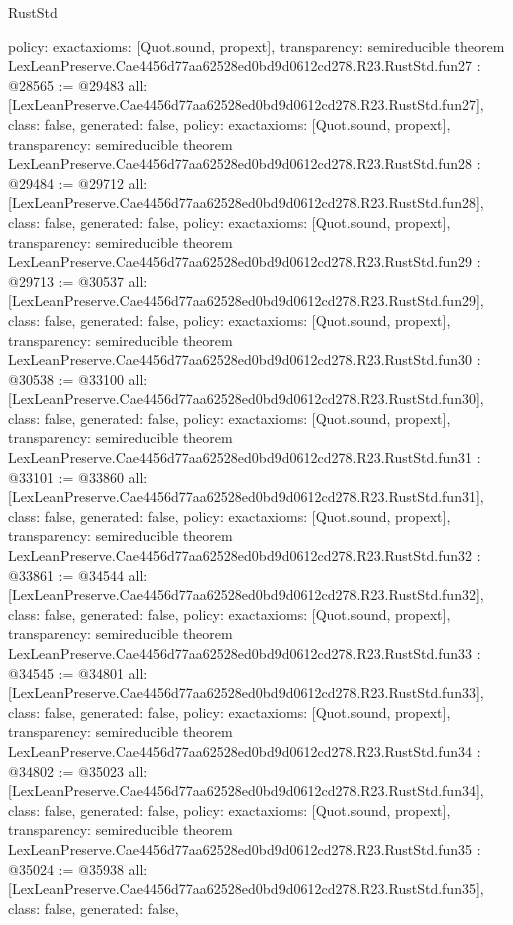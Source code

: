 \begin{lexlean}{RustStd}
\begin{coremodule}
{  policy: exact{axioms: [Quot.sound, propext]},
  transparency: semireducible
}
theorem LexLeanPreserve.Cae4456d77aa62528ed0bd9d0612cd278.R23.RustStd.fun27 : @28565 := @29483 {
  all: [LexLeanPreserve.Cae4456d77aa62528ed0bd9d0612cd278.R23.RustStd.fun27],
  class: false,
  generated: false,
  policy: exact{axioms: [Quot.sound, propext]},
  transparency: semireducible
}
theorem LexLeanPreserve.Cae4456d77aa62528ed0bd9d0612cd278.R23.RustStd.fun28 : @29484 := @29712 {
  all: [LexLeanPreserve.Cae4456d77aa62528ed0bd9d0612cd278.R23.RustStd.fun28],
  class: false,
  generated: false,
  policy: exact{axioms: [Quot.sound, propext]},
  transparency: semireducible
}
theorem LexLeanPreserve.Cae4456d77aa62528ed0bd9d0612cd278.R23.RustStd.fun29 : @29713 := @30537 {
  all: [LexLeanPreserve.Cae4456d77aa62528ed0bd9d0612cd278.R23.RustStd.fun29],
  class: false,
  generated: false,
  policy: exact{axioms: [Quot.sound, propext]},
  transparency: semireducible
}
theorem LexLeanPreserve.Cae4456d77aa62528ed0bd9d0612cd278.R23.RustStd.fun30 : @30538 := @33100 {
  all: [LexLeanPreserve.Cae4456d77aa62528ed0bd9d0612cd278.R23.RustStd.fun30],
  class: false,
  generated: false,
  policy: exact{axioms: [Quot.sound, propext]},
  transparency: semireducible
}
theorem LexLeanPreserve.Cae4456d77aa62528ed0bd9d0612cd278.R23.RustStd.fun31 : @33101 := @33860 {
  all: [LexLeanPreserve.Cae4456d77aa62528ed0bd9d0612cd278.R23.RustStd.fun31],
  class: false,
  generated: false,
  policy: exact{axioms: [Quot.sound, propext]},
  transparency: semireducible
}
theorem LexLeanPreserve.Cae4456d77aa62528ed0bd9d0612cd278.R23.RustStd.fun32 : @33861 := @34544 {
  all: [LexLeanPreserve.Cae4456d77aa62528ed0bd9d0612cd278.R23.RustStd.fun32],
  class: false,
  generated: false,
  policy: exact{axioms: [Quot.sound, propext]},
  transparency: semireducible
}
theorem LexLeanPreserve.Cae4456d77aa62528ed0bd9d0612cd278.R23.RustStd.fun33 : @34545 := @34801 {
  all: [LexLeanPreserve.Cae4456d77aa62528ed0bd9d0612cd278.R23.RustStd.fun33],
  class: false,
  generated: false,
  policy: exact{axioms: [Quot.sound, propext]},
  transparency: semireducible
}
theorem LexLeanPreserve.Cae4456d77aa62528ed0bd9d0612cd278.R23.RustStd.fun34 : @34802 := @35023 {
  all: [LexLeanPreserve.Cae4456d77aa62528ed0bd9d0612cd278.R23.RustStd.fun34],
  class: false,
  generated: false,
  policy: exact{axioms: [Quot.sound, propext]},
  transparency: semireducible
}
theorem LexLeanPreserve.Cae4456d77aa62528ed0bd9d0612cd278.R23.RustStd.fun35 : @35024 := @35938 {
  all: [LexLeanPreserve.Cae4456d77aa62528ed0bd9d0612cd278.R23.RustStd.fun35],
  class: false,
  generated: false,
}
\end{coremodule}
\end{lexlean}
